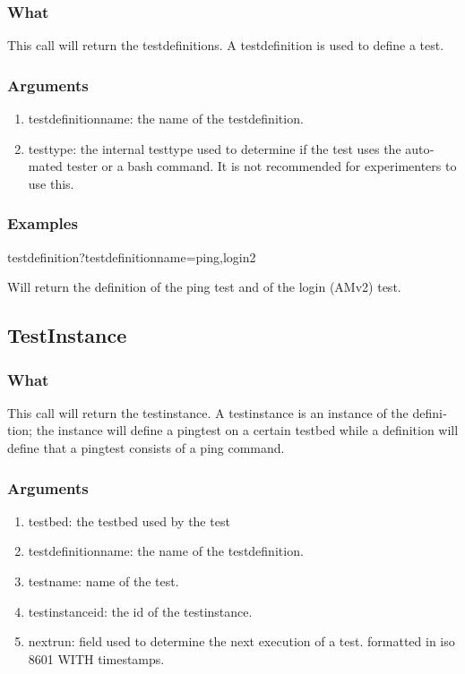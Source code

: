 \begin{otherlanguage}{english}
\subsubsection{What}
This call will return the testdefinitions. A testdefinition is used to define a test.
\subsubsection{Arguments}
\begin{enumerate}
\item testdefinitionname: the name of the testdefinition.
\item testtype: the internal testtype used to determine if the test uses the automated tester or a bash command. It is not recommended for experimenters to use this.
\end{enumerate}
\subsubsection{Examples}
\begin{lt}
testdefinition?testdefinitionname=ping,login2
\end{lt}
Will return the definition of the ping test and of the login (AMv2) test.
\\
\subsection{TestInstance}
\subsubsection{What}
This call will return the testinstance. A testinstance is an instance of the definition; the instance will define a pingtest on a certain testbed while a definition will define that a pingtest consists of a ping command. 
\subsubsection{Arguments}
\begin{enumerate}
\item testbed: the testbed used by the test
\item testdefinitionname: the name of the testdefinition.
\item testname: name of the test.
\item testinstanceid: the id of the testinstance.
\item nextrun: field used to determine the next execution of a test. formatted in iso 8601 WITH timestamps.
\end{enumerate}
\clearpage

\end{otherlanguage}
